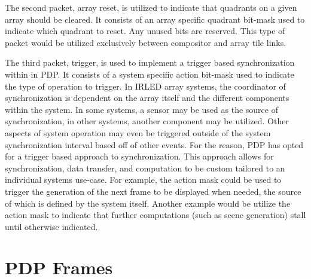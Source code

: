 The second packet, array reset, is utilized to indicate that quadrants on a given array should be cleared. It consists of an array specific quadrant bit-mask used to indicate which quadrant to reset. Any unused bits are reserved. This type of packet would be utilized exclusively between compositor and array tile links.

The third packet, trigger, is used to implement a trigger based synchronization within in PDP. It consists of a system specific action bit-mask used to indicate the type of operation to trigger. In IRLED array systems, the coordinator of synchronization is dependent on the array itself and the different components within the system. In some systems, a sensor may be used as the source of synchronization, in other systems, another component may be utilized. Other aspects of system operation may even be triggered outside of the system synchronization interval based off of other events. For the reason, PDP has opted for a trigger based approach to synchronization. This approach allows for synchronization, data transfer, and computation to be custom tailored to an individual systems use-case. For example, the action mask could be used to trigger the generation of the next frame to be displayed when needed, the source of which is defined by the system itself. Another example would be utilize the action mask to indicate that further computations (such as scene generation) stall until otherwise indicated.

\section{PDP Frames}
